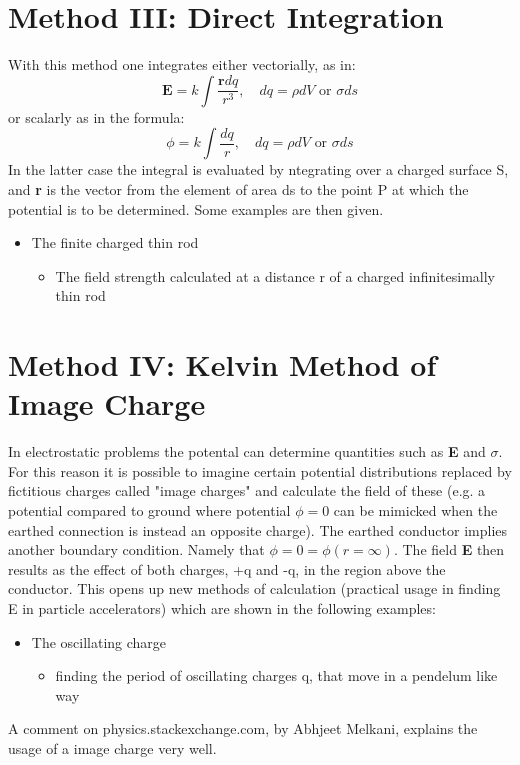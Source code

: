 \section{Method III: Direct Integration}
With this method one integrates either vectorially, as in:
\begin{equation}
    \textbf{E} = k\int \frac{\textbf{r}dq}{r^3}, \quad dq = \rho dV \text{ or } \sigma ds
\end{equation}
or scalarly as in the formula:
\begin{equation}
    \phi = k \int \frac{dq}{r}, \quad dq = \rho dV  \text{ or } \sigma ds
\end{equation}
In the latter case the integral is evaluated by ntegrating over a charged surface S, and \textbf{r} is the vector from the element of area ds to the point P at which the potential is to be determined.
Some examples are then given.
\begin{itemize}
    \item The finite charged thin rod
    \begin{itemize}
        \item The field strength calculated at a distance r of a charged infinitesimally thin rod
    \end{itemize}
\end{itemize}
\section{Method IV: Kelvin Method of Image Charge}
In electrostatic problems the potental can determine quantities such as \textbf{E} and $\sigma$. For this reason it is possible to imagine certain potential distributions replaced by fictitious charges called "image charges"
and calculate the field of these (e.g. a potential compared to ground where potential $\phi = 0$ can be mimicked when the earthed connection is instead an opposite charge). The earthed conductor implies another boundary condition.
Namely that $\phi = 0 = \phi(r = \infty)$. The field \textbf{E} then results as the effect of both charges, +q and -q, in the region above the conductor. This opens up new methods of calculation (practical usage in finding E in particle accelerators) which are shown in the following examples:
\begin{itemize}
    \item The oscillating charge
    \begin{itemize}
        \item finding the period of oscillating charges q, that move in a pendelum like way
    \end{itemize}
\end{itemize}
A comment on physics.stackexchange.com, by Abhjeet Melkani, explains the usage of a image charge very well.

